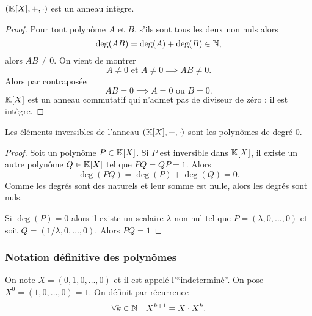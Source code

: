 \begin{cor}
  \((\mathbb{K}[X],+,\cdot)\) est un anneau intègre.
\end{cor}
\begin{proof}
  Pour tout polynôme \(A\) et \(B\), s'ils sont tous les deux non nuls alors
  \begin{equation}
    \deg(AB) = \deg(A)+\deg(B) \in \mathbb{N},
  \end{equation}
  alors \(AB \neq 0\). On vient de montrer
  \begin{equation}
    A\neq 0 \text{~et~} A \neq 0 \implies AB \neq 0.
  \end{equation}
  Alors par contraposée
  \begin{equation}
    AB = 0 \implies A = 0 \text{~ou~} B = 0.
  \end{equation}
  \(\mathbb{K}[X]\) est un anneau commutatif qui n'admet pas de diviseur de zéro : il 
  est intègre.
\end{proof}

\begin{prop}
  Les éléments inversibles de l'anneau \((\mathbb{K}[X],+,\cdot)\) sont les polynômes de 
  degré \(0\).
\end{prop}
\begin{proof}
  Soit un polynôme \(P \in \mathbb{K}[X]\). Si \(P\) est inversible dans \(\mathbb{K}[X]\), il 
  existe un autre polynôme \(Q \in \mathbb{K}[X]\) tel que \(PQ = QP = 1\). Alors
  \begin{equation}
    \deg(PQ) = \deg(P)+\deg(Q) = 0.
  \end{equation}
  Comme les degrés sont des naturels et leur somme est nulle, alors les degrés 
  sont nuls.

  Si \(\deg(P) = 0\) alors il existe un scalaire \(\lambda\) non nul tel que 
  \(P = (\lambda,0, \ldots, 0)\) et soit \(Q = (1/\lambda, 0, \ldots, 0)\). Alors 
  \(PQ = 1\)
\end{proof}

\subsubsection{Notation définitive des polynômes}

On note \(X = (0,1,0, \ldots, 0)\) et il est appelé l'``indeterminé''. On pose 
\(X^0 = (1,0, \ldots,0) = 1\). On définit par récurrence
\begin{equation}
  \forall k \in \mathbb{N} \quad X^{k+1} = X \cdot X^k.
\end{equation}

